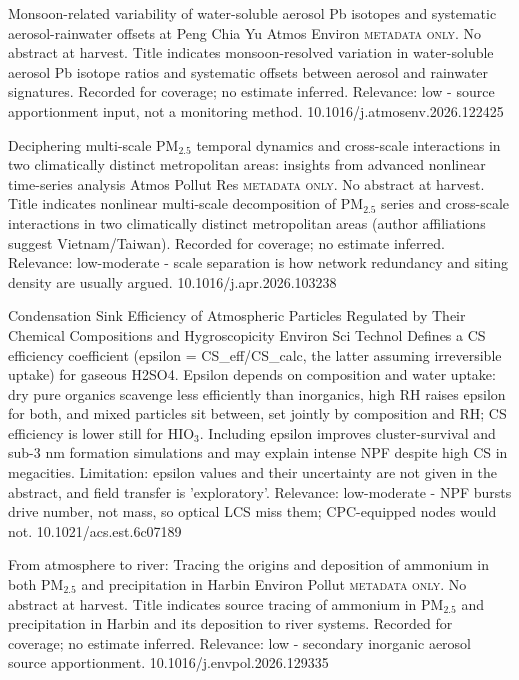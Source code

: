 \documentclass[10pt]{article}
\begin{document}
{Monsoon-related variability of water-soluble aerosol Pb isotopes and systematic aerosol-rainwater offsets at Peng Chia Yu}
{Atmos Environ}
{\textsc{metadata only.} No abstract at harvest. Title indicates monsoon-resolved variation in water-soluble aerosol Pb isotope ratios and systematic offsets between aerosol and rainwater signatures. Recorded for coverage; no estimate inferred. Relevance: low - source apportionment input, not a monitoring method.}
{10.1016/j.atmosenv.2026.122425}

{Deciphering multi-scale PM$_{2.5}$ temporal dynamics and cross-scale interactions in two climatically distinct metropolitan areas: insights from advanced nonlinear time-series analysis}
{Atmos Pollut Res}
{\textsc{metadata only.} No abstract at harvest. Title indicates nonlinear multi-scale decomposition of PM$_{2.5}$ series and cross-scale interactions in two climatically distinct metropolitan areas (author affiliations suggest Vietnam/Taiwan). Recorded for coverage; no estimate inferred. Relevance: low-moderate - scale separation is how network redundancy and siting density are usually argued.}
{10.1016/j.apr.2026.103238}

{Condensation Sink Efficiency of Atmospheric Particles Regulated by Their Chemical Compositions and Hygroscopicity}
{Environ Sci Technol}
{Defines a CS efficiency coefficient (epsilon = CS\_eff/CS\_calc, the latter assuming irreversible uptake) for gaseous H2SO4. Epsilon depends on composition and water uptake: dry pure organics scavenge less efficiently than inorganics, high RH raises epsilon for both, and mixed particles sit between, set jointly by composition and RH; CS efficiency is lower still for HIO$_3$. Including epsilon improves cluster-survival and sub-3 nm formation simulations and may explain intense NPF despite high CS in megacities. Limitation: epsilon values and their uncertainty are not given in the abstract, and field transfer is 'exploratory'. Relevance: low-moderate - NPF bursts drive number, not mass, so optical LCS miss them; CPC-equipped nodes would not.}
{10.1021/acs.est.6c07189}

{From atmosphere to river: Tracing the origins and deposition of ammonium in both PM$_{2.5}$ and precipitation in Harbin}
{Environ Pollut}
{\textsc{metadata only.} No abstract at harvest. Title indicates source tracing of ammonium in PM$_{2.5}$ and precipitation in Harbin and its deposition to river systems. Recorded for coverage; no estimate inferred. Relevance: low - secondary inorganic aerosol source apportionment.}
{10.1016/j.envpol.2026.129335}
\end{document}
